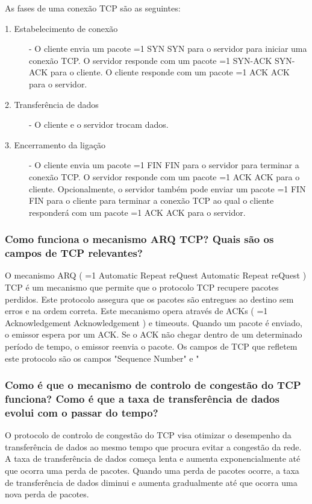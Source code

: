 \documentclass[11pt,a4paper,twocolumn]{article}
\newcommand{\hl}[2][1]{%
  \ifnum#1=1\relax
    \textcolor{text-hl1}{#2}%
  \else
    \textcolor{text-hl2}{#2}%
  \fi
}
\begin{document}
As fases de uma conexão TCP são as seguintes:
\begin{description}
    \item[1. Estabelecimento de conexão] - O cliente envia um pacote \hl{SYN} para o servidor para iniciar uma conexão TCP. O servidor responde com um pacote \hl{SYN-ACK} para o cliente. O cliente responde com um pacote \hl{ACK} para o servidor.
    \item[2. Transferência de dados] - O cliente e o servidor trocam dados.
    \item[3. Encerramento da ligação] - O cliente envia um pacote \hl{FIN} para o servidor para terminar a conexão TCP. O servidor responde com um pacote \hl{ACK} para o cliente. Opcionalmente, o servidor também pode enviar um pacote \hl{FIN} para o cliente para terminar a conexão TCP ao qual o cliente responderá com um pacote \hl{ACK} para o servidor. 
\end{description}

\subsubsection{Como funciona o mecanismo ARQ TCP? Quais são os campos de TCP relevantes?}

O mecanismo ARQ (\hl{Automatic Repeat reQuest}) TCP é um mecanismo que permite que o protocolo TCP recupere pacotes perdidos. Este protocolo assegura que os pacotes são entregues ao destino sem erros e na ordem correta. Este mecanismo opera através de ACKs (\hl[2]{Acknowledgement}) e timeouts. Quando um pacote é enviado, o emissor espera por um ACK. Se o ACK não chegar dentro de um determinado período de tempo, o emissor reenvia o pacote.
Os campos de TCP que refletem este protocolo são os campos "Sequence Number" e "

\subsubsection{Como é que o mecanismo de controlo de congestão do TCP funciona? Como é que a taxa de transferência de dados evolui com o passar do tempo?}

O protocolo de controlo de congestão do TCP visa otimizar o desempenho da transferência de dados ao mesmo tempo que procura evitar a congestão da rede. A taxa de transferência de dados começa lenta e aumenta exponencialmente até que ocorra uma perda de pacotes. Quando uma perda de pacotes ocorre, a taxa de transferência de dados diminui e aumenta gradualmente até que ocorra uma nova perda de pacotes.
\end{document}
